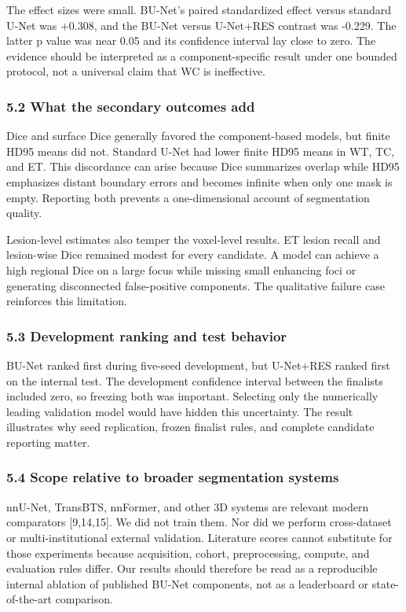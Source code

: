 \documentclass[
  10pt,
  letterpaper,
]{article}
\begin{document}
The effect sizes were small. BU-Net's paired standardized effect versus
standard U-Net was +0.308, and the BU-Net versus U-Net+RES contrast was
-0.229. The latter p value was near 0.05 and its confidence interval lay
close to zero. The evidence should be interpreted as a
component-specific result under one bounded protocol, not a universal
claim that WC is ineffective.

\subsubsection{5.2 What the secondary outcomes
add}\label{what-the-secondary-outcomes-add}

Dice and surface Dice generally favored the component-based models, but
finite HD95 means did not. Standard U-Net had lower finite HD95 means in
WT, TC, and ET. This discordance can arise because Dice summarizes
overlap while HD95 emphasizes distant boundary errors and becomes
infinite when only one mask is empty. Reporting both prevents a
one-dimensional account of segmentation quality.

Lesion-level estimates also temper the voxel-level results. ET lesion
recall and lesion-wise Dice remained modest for every candidate. A model
can achieve a high regional Dice on a large focus while missing small
enhancing foci or generating disconnected false-positive components. The
qualitative failure case reinforces this limitation.

\subsubsection{5.3 Development ranking and test
behavior}\label{development-ranking-and-test-behavior}

BU-Net ranked first during five-seed development, but U-Net+RES ranked
first on the internal test. The development confidence interval between
the finalists included zero, so freezing both was important. Selecting
only the numerically leading validation model would have hidden this
uncertainty. The result illustrates why seed replication, frozen
finalist rules, and complete candidate reporting matter.

\subsubsection{5.4 Scope relative to broader segmentation
systems}\label{scope-relative-to-broader-segmentation-systems}

nnU-Net, TransBTS, nnFormer, and other 3D systems are relevant modern
comparators {[}9,14,15{]}. We did not train them. Nor did we perform
cross-dataset or multi-institutional external validation. Literature
scores cannot substitute for those experiments because acquisition,
cohort, preprocessing, compute, and evaluation rules differ. Our results
should therefore be read as a reproducible internal ablation of
published BU-Net components, not as a leaderboard or state-of-the-art
comparison.
\end{document}
